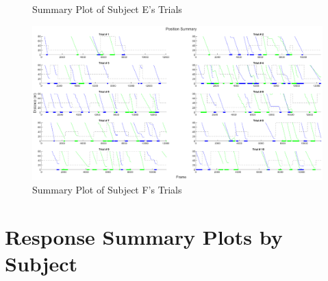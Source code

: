 \begin{appendices}
\begin{figure}[H]
    \caption{Summary Plot of Subject E's Trials}
    \label{fig:SumE}
\end{figure}
\begin{figure}[H]
    \centering
    \includegraphics[width=\linewidth, height=\plotHeight\linewidth]{figures/subject_f_summary.eps}
    \caption{Summary Plot of Subject F's Trials}
    \label{fig:SumF}
\end{figure}

\section{Response Summary Plots by Subject}
\label{appendix:ExtraResults0_2}

\end{appendices}
